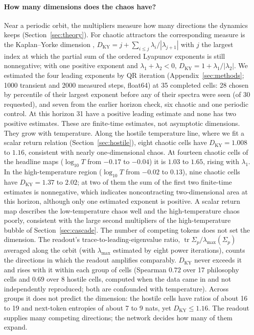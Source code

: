 \documentclass[11pt,letterpaper]{article}
\begin{document}
\paragraph{How many dimensions does the chaos have?} Near a periodic orbit, the multipliers measure how many
directions the dynamics keeps (Section~\ref{sec:theory}). For chaotic attractors the corresponding measure is the
Kaplan--Yorke dimension \cite{kaplan1979chaotic}, $D_{\mathrm{KY}}=j+\sum_{i\le j}\lambda_i/|\lambda_{j+1}|$ with $j$ the
largest index at which the partial sum of the ordered Lyapunov exponents is still nonnegative; with one positive
exponent and $\lambda_1+\lambda_2<0$, $D_{\mathrm{KY}}=1+\lambda_1/|\lambda_2|$. We estimated the four leading
exponents by QR iteration (Appendix~\ref{sec:methods}; 1000 transient and 2000 measured steps, float64) at 35 completed
cells: 28 chosen by percentile of their largest exponent before any of their spectra were seen (of 30 requested), and
seven from the earlier horizon check, six chaotic and one periodic control. At this horizon 31 have a positive leading
estimate and none has two positive estimates. These are finite-time estimates, not asymptotic dimensions. They grow
with temperature. Along the hostile temperature line, where we fit a scalar return relation (Section~\ref{sec:hostile}), eight chaotic cells have $D_{\mathrm{KY}}=1.008$ to $1.16$, consistent with nearly
one-dimensional chaos. At fourteen chaotic cells of the
headline maps ($\log_{10}T$ from $-0.17$ to $-0.04$) it is $1.03$ to $1.65$, rising with $\lambda_1$. In the
high-temperature region ($\log_{10}T$ from $-0.02$ to $0.13$), nine chaotic cells have $D_{\mathrm{KY}}=1.37$ to
$2.02$; at two of them the sum of the first two finite-time estimates is nonnegative, which indicates noncontracting
two-dimensional area at this horizon, although only one estimated exponent is positive. A scalar return
map describes the low-temperature chaos well and the high-temperature chaos poorly, consistent with the large second
multipliers of the high-temperature bubble of Section~\ref{sec:cascade}. The number of competing tokens does not
set the dimension. The readout's
trace-to-leading-eigenvalue ratio, $\operatorname{tr}\Sigma_p/\lambda_{\max}(\Sigma_p)$ averaged along the orbit (with
$\lambda_{\max}$ estimated by eight power iterations), counts the directions in which the readout amplifies comparably.
$D_{\mathrm{KY}}$ never exceeds it and rises with it within each group of cells (Spearman $0.72$ over 17 philosophy
cells and $0.69$ over 8 hostile cells, computed when the data came in and not independently reproduced; both are
confounded with temperature). Across groups it does not predict the dimension: the hostile cells have ratios of about
16 to 19 and next-token entropies of about 7 to 9 nats, yet $D_{\mathrm{KY}}\le1.16$. The readout supplies many competing directions; the network decides how many
of them expand.
\end{document}
